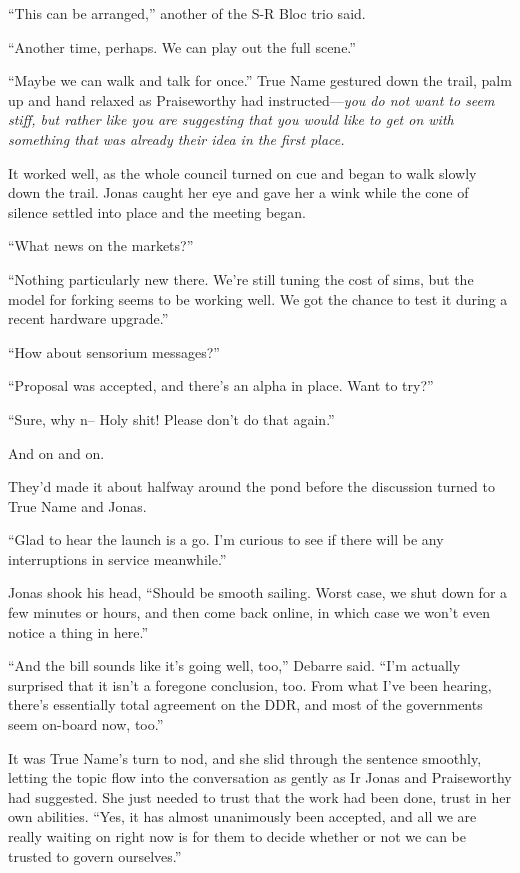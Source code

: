 ``This can be arranged,'' another of the S-R Bloc trio said.

``Another time, perhaps. We can play out the full scene.''

``Maybe we can walk and talk for once.'' True Name gestured down the trail, palm up and hand relaxed as Praiseworthy had instructed---\emph{you do not want to seem stiff, but rather like you are suggesting that you would like to get on with something that was already their idea in the first place.}

It worked well, as the whole council turned on cue and began to walk slowly down the trail. Jonas caught her eye and gave her a wink while the cone of silence settled into place and the meeting began.

``What news on the markets?''

``Nothing particularly new there. We're still tuning the cost of sims, but the model for forking seems to be working well. We got the chance to test it during a recent hardware upgrade.''

``How about sensorium messages?''

``Proposal was accepted, and there's an alpha in place. Want to try?''

``Sure, why n-- Holy shit! Please don't do that again.''

And on and on.

They'd made it about halfway around the pond before the discussion turned to True Name and Jonas.

``Glad to hear the launch is a go. I'm curious to see if there will be any interruptions in service meanwhile.''

Jonas shook his head, ``Should be smooth sailing. Worst case, we shut down for a few minutes or hours, and then come back online, in which case we won't even notice a thing in here.''

``And the bill sounds like it's going well, too,'' Debarre said. ``I'm actually surprised that it isn't a foregone conclusion, too. From what I've been hearing, there's essentially total agreement on the DDR, and most of the governments seem on-board now, too.''

It was True Name's turn to nod, and she slid through the sentence smoothly, letting the topic flow into the conversation as gently as Ir Jonas and Praiseworthy had suggested. She just needed to trust that the work had been done, trust in her own abilities. ``Yes, it has almost unanimously been accepted, and all we are really waiting on right now is for them to decide whether or not we can be trusted to govern ourselves.''

